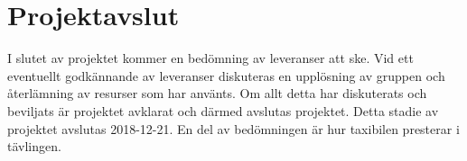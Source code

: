 \documentclass[projektplan/plan.tex]{subfiles}
\begin{document}
\section{Projektavslut}
I slutet av projektet kommer en bedömning av leveranser att ske. Vid ett
eventuellt godkännande av leveranser diskuteras en upplösning av gruppen och
återlämning av resurser som har använts. Om allt detta har diskuterats och
beviljats är projektet avklarat och därmed avslutas projektet. Detta stadie av
projektet avslutas 2018-12-21. En del av bedömningen är hur taxibilen presterar
i tävlingen.
\end{document}
